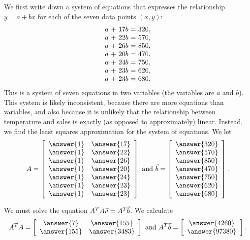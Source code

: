 \documentclass{ximera}
\begin{document}
\begin{example}
  We first write down a system of equations that expresses the
  relationship $y=a+bx$ for each of the seven data points $(x,y)$:
  \begin{equation*}
    \begin{array}{r@{~}c@{~}r@{~}c@{~}r}
      a &+& 17b &=& 320, \\
      a &+& 22b &=& 570, \\
      a &+& 26b &=& 850, \\
      a &+& 20b &=& 470, \\
      a &+& 24b &=& 750, \\
      a &+& 23b &=& 620, \\
      a &+& 23b &=& 680. \\
    \end{array}
  \end{equation*}
  This is a system of seven equations in two variables (the variables
  are $a$ and $b$). This system is likely inconsistent, because there
  are more equations than variables, and also because it is unlikely
  that the relationship between temperature and sales is exactly (as
  opposed to approximately) linear. Instead, we find the least squares
  approximation for the system of equations. We let
  \begin{equation*}
    A = \startmat{rr}
      \answer{1} & \answer{17} \\
      \answer{1} & \answer{22} \\
      \answer{1} & \answer{26} \\
      \answer{1} & \answer{20} \\
      \answer{1} & \answer{24} \\
      \answer{1} & \answer{23} \\
      \answer{1} & \answer{23} \\
    \stopmat
    \quad\mbox{and}\quad
    \vect{b} =
    \startmat{r}
      \answer{320} \\
      \answer{570} \\
      \answer{850} \\
      \answer{470} \\
      \answer{750} \\
      \answer{620} \\
      \answer{680} \\
    \stopmat.
\end{equation*}

We must solve
the equation $A^TA\vec{v} = A^T\vec{b}$. We calculate
\begin{equation*}
  A^TA = \startmat{cc}
    \answer{7} & \answer{155} \\
    \answer{155} & \answer{3483}
  \stopmat
  \quad\mbox{and}\quad
  A^T\vect{b} =
  \startmat{c}
    \answer{4260} \\
    \answer{97380}
  \stopmat.
\end{equation*}


\end{example}
\end{document}
